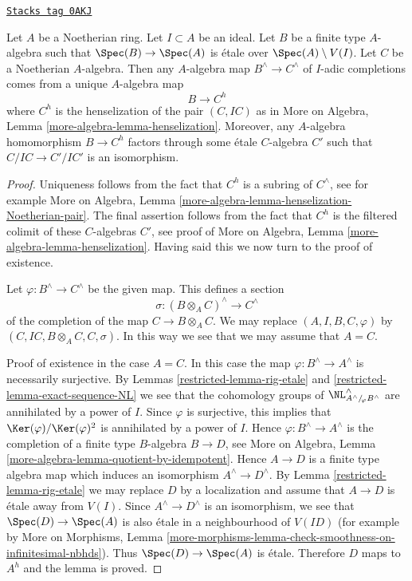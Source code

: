 \begin{lemma}
\label{restricted-lemma-fully-faithful-etale-over-complement}
\href{https://stacks.math.columbia.edu/tag/0AKJ}{\texttt{Stacks tag 0AKJ}}

Let $A$ be a Noetherian ring. Let $I \subset A$ be an ideal.
Let $B$ be a finite type $A$-algebra such that
$\Spec(B) \to \Spec(A)$ is \'etale over $\Spec(A) \setminus V(I)$.
Let $C$ be a Noetherian $A$-algebra. Then any $A$-algebra
map $B^\wedge \to C^\wedge$ of $I$-adic completions
comes from a unique $A$-algebra map
$$
B \longrightarrow C^h
$$
where $C^h$ is the henselization of the pair $(C, IC)$ as
in More on Algebra, Lemma \ref{more-algebra-lemma-henselization}.
Moreover, any $A$-algebra homomorphism $B \to C^h$ factors through
some \'etale $C$-algebra $C'$ such that $C/IC \to C'/IC'$ is an isomorphism.
\end{lemma}

\begin{proof}

Uniqueness follows from the fact that $C^h$ is a subring of
$C^\wedge$, see for example
More on Algebra, Lemma \ref{more-algebra-lemma-henselization-Noetherian-pair}.
The final assertion follows from the fact that $C^h$ is the filtered colimit
of these $C$-algebras $C'$, see proof of
More on Algebra, Lemma \ref{more-algebra-lemma-henselization}.
Having said this we now turn to the proof of existence.

\medskip\noindent
Let $\varphi : B^\wedge \to C^\wedge$ be the given map.
This defines a section
$$
\sigma : (B \otimes_A C)^\wedge \longrightarrow C^\wedge
$$
of the completion of the map $C \to B \otimes_A C$. We may
replace $(A, I, B, C, \varphi)$ by $(C, IC, B \otimes_A C, C, \sigma)$.
In this way we see that we may assume that $A = C$.

\medskip\noindent
Proof of existence in the case $A = C$. In this case the map
$\varphi : B^\wedge \to A^\wedge$ is necessarily surjective.
By Lemmas \ref{restricted-lemma-rig-etale} and \ref{restricted-lemma-exact-sequence-NL}
we see that the cohomology groups of
$\NL_{A^\wedge/\!_\varphi B^\wedge}^\wedge$
are annihilated by a power of $I$. Since $\varphi$ is surjective,
this implies that $\Ker(\varphi)/\Ker(\varphi)^2$ is annihilated
by a power of $I$. Hence $\varphi : B^\wedge \to A^\wedge$
is the completion of a finite type $B$-algebra $B \to D$, see
More on Algebra, Lemma \ref{more-algebra-lemma-quotient-by-idempotent}.
Hence $A \to D$ is a finite type algebra map which induces an isomorphism
$A^\wedge \to D^\wedge$. By
Lemma \ref{restricted-lemma-rig-etale} we may replace $D$ by a localization
and assume that $A \to D$ is \'etale away from $V(I)$.
Since $A^\wedge \to D^\wedge$ is an isomorphism, we see that
$\Spec(D) \to \Spec(A)$ is also \'etale in a neighbourhood of $V(ID)$
(for example by
More on Morphisms, Lemma
\ref{more-morphisms-lemma-check-smoothness-on-infinitesimal-nbhds}).
Thus $\Spec(D) \to \Spec(A)$ is \'etale. Therefore $D$ maps to
$A^h$ and the lemma is proved.
\end{proof}

